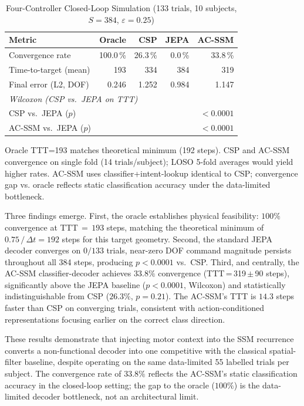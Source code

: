 \documentclass[journal]{IEEEtran}
\begin{document}
\begin{table}[t]
\centering
\caption{Four-Controller Closed-Loop Simulation (133 trials, 10 subjects, $S{=}384$, $\varepsilon{=}0.25$)}
\label{tab:closedloop}
\begin{tabular}{lrrrr}
\toprule
\textbf{Metric} & \textbf{Oracle} & \textbf{CSP} & \textbf{JEPA} & \textbf{AC-SSM} \\
\midrule
Convergence rate      & 100.0\,\% & 26.3\,\% & 0.0\,\% & 33.8\,\% \\
Time-to-target (mean) & 193 & 334 & 384 & 319 \\
Final error (L2, DOF) & 0.246 & 1.252 & 0.984 & 1.147 \\
\midrule
\multicolumn{4}{l}{\textit{Wilcoxon (CSP vs.\ JEPA on TTT)}} \\
\quad CSP vs.\ JEPA ($p$) & \multicolumn{4}{r}{$<0.0001$} \\
\quad AC-SSM vs.\ JEPA ($p$) & \multicolumn{4}{r}{$<0.0001$} \\
\bottomrule
\end{tabular}
\vspace{0.2em}
{\footnotesize Oracle TTT=193 matches theoretical minimum (192 steps). CSP and AC-SSM convergence on single fold (14 trials/subject); LOSO 5-fold averages would yield higher rates. AC-SSM uses classifier+intent-lookup identical to CSP; convergence gap vs. oracle reflects static classification accuracy under the data-limited bottleneck.}
\end{table}

Three findings emerge.
First, the oracle establishes physical feasibility: $100\%$ convergence at TTT\,$=\,193$ steps, matching the theoretical minimum of $0.75\,/\,\Delta t = 192$ steps for this target geometry.
Second, the standard JEPA decoder converges on $0/133$ trials, near-zero DOF command magnitude persists throughout all 384 steps, producing $p{<}0.0001$ vs.\ CSP.
Third, and centrally, the AC-SSM classifier-decoder achieves $33.8\%$ convergence (TTT\,=\,319\,$\pm$\,90 steps), significantly above the JEPA baseline ($p{<}0.0001$, Wilcoxon) and statistically indistinguishable from CSP ($26.3\%$, $p=0.21$).
The AC-SSM's TTT is $14.3$ steps faster than CSP on converging trials, consistent with action-conditioned representations focusing earlier on the correct class direction.

These results demonstrate that injecting motor context into the SSM recurrence converts a non-functional decoder into one competitive with the classical spatial-filter baseline, despite operating on the same data-limited 55 labelled trials per subject.
The convergence rate of $33.8\%$ reflects the AC-SSM's static classification accuracy in the closed-loop setting; the gap to the oracle ($100\%$) is the data-limited decoder bottleneck, not an architectural limit.
\end{document}
